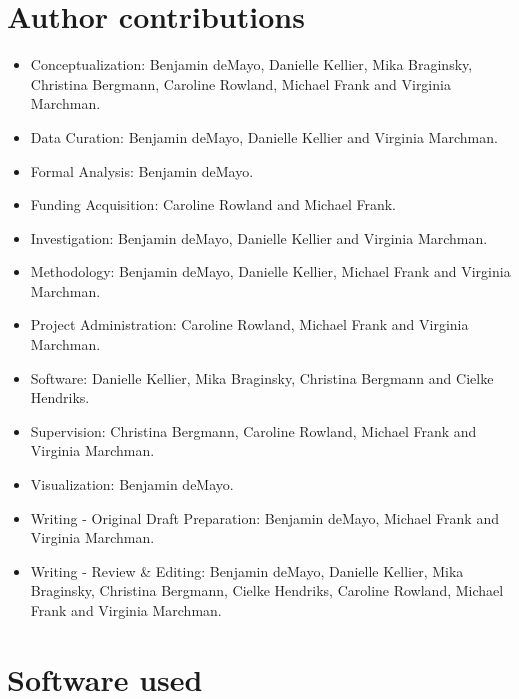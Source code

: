 \documentclass[
  english,
  ,man,floatsintext]{apa6}
\providecommand{\tightlist}{%
  \setlength{\itemsep}{0pt}\setlength{\parskip}{0pt}}
\begin{document}
\hypertarget{author-contributions}{%
\section{Author contributions}\label{author-contributions}}

\begin{itemize}
\tightlist
\item
  Conceptualization: Benjamin deMayo, Danielle Kellier, Mika Braginsky, Christina Bergmann, Caroline Rowland, Michael Frank and Virginia Marchman.
\item
  Data Curation: Benjamin deMayo, Danielle Kellier and Virginia Marchman.
\item
  Formal Analysis: Benjamin deMayo.
\item
  Funding Acquisition: Caroline Rowland and Michael Frank.
\item
  Investigation: Benjamin deMayo, Danielle Kellier and Virginia Marchman.
\item
  Methodology: Benjamin deMayo, Danielle Kellier, Michael Frank and Virginia Marchman.
\item
  Project Administration: Caroline Rowland, Michael Frank and Virginia Marchman.
\item
  Software: Danielle Kellier, Mika Braginsky, Christina Bergmann and Cielke Hendriks.
\item
  Supervision: Christina Bergmann, Caroline Rowland, Michael Frank and Virginia Marchman.
\item
  Visualization: Benjamin deMayo.
\item
  Writing - Original Draft Preparation: Benjamin deMayo, Michael Frank and Virginia Marchman.
\item
  Writing - Review \& Editing: Benjamin deMayo, Danielle Kellier, Mika Braginsky, Christina Bergmann, Cielke Hendriks, Caroline Rowland, Michael Frank and Virginia Marchman.
\end{itemize}

\hypertarget{software-used}{%
\section{Software used}\label{software-used}}
\end{document}

